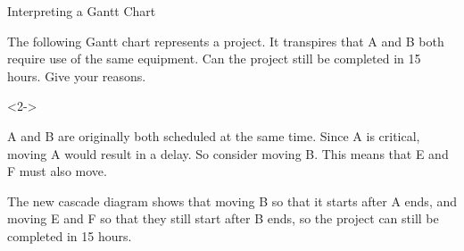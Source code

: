 \documentclass[8pt]{beamer}
\begin{document}
\begin{frame}{Interpreting a Gantt Chart}
	\begin{problem}
		\begin{minipage}{.4\linewidth}
		The following Gantt chart represents a project. It transpires that A and B both require use of the same equipment. Can the project still be completed in 15 hours. Give your reasons.
	\end{minipage}%
	\begin{minipage}{.6\linewidth}
		\centering
\end{minipage}
	\end{problem}

\begin{solution}<2->
	\begin{minipage}{.5\linewidth}
	A and B are originally both scheduled at the same time. Since A is critical, moving A would result in a delay. So consider moving B. This means that E and F must also move.

The new cascade diagram shows that moving B so that it starts after A ends, and moving E and F so that they still start after B ends, so the project can still be completed in 15 hours.
\end{minipage}%
\begin{minipage}{.5\linewidth}
		\centering
\end{minipage}
\end{solution}


\end{frame}
\end{document}
